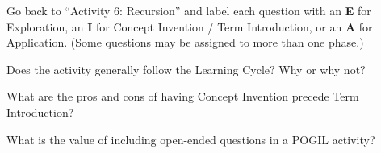 

\Q Go back to ``Activity 6: Recursion'' and label each question with an \textbf{E} for Exploration, an \textbf{I} for Concept Invention / Term Introduction, or an \textbf{A} for Application. (Some questions may be assigned to more than one phase.)

\begin{answer}[1em]
\end{answer}


\Q Does the activity generally follow the Learning Cycle? Why or why not?

\begin{answer}
\end{answer}


\Q What are the pros and cons of having Concept Invention precede Term Introduction?

\begin{answer}
\end{answer}


\Q What is the value of including open-­ended questions in a POGIL activity?

\begin{answer}
\end{answer}
